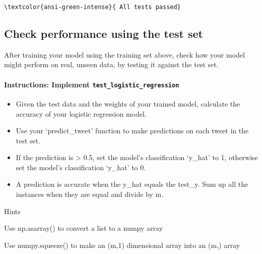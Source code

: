 \documentclass[11pt]{article}
\providecommand{\tightlist}{%
      \setlength{\itemsep}{0pt}\setlength{\parskip}{0pt}}
\begin{document}
    \begin{Verbatim}[commandchars=\\\{\}]
\textcolor{ansi-green-intense}{ All tests passed}
    \end{Verbatim}

    \hypertarget{check-performance-using-the-test-set}{%
\subsection{Check performance using the test
set}\label{check-performance-using-the-test-set}}

After training your model using the training set above, check how your
model might perform on real, unseen data, by testing it against the test
set.

\hypertarget{instructions-implement-test_logistic_regression}{%
\paragraph{\texorpdfstring{Instructions: Implement
\texttt{test\_logistic\_regression}}{Instructions: Implement test\_logistic\_regression}}\label{instructions-implement-test_logistic_regression}}

\begin{itemize}
\tightlist
\item
  Given the test data and the weights of your trained model, calculate
  the accuracy of your logistic regression model.
\item
  Use your `predict\_tweet' function to make predictions on each tweet
  in the test set.
\item
  If the prediction is \textgreater{} 0.5, set the model's
  classification `y\_hat' to 1, otherwise set the model's classification
  `y\_hat' to 0.
\item
  A prediction is accurate when the y\_hat equals the test\_y. Sum up
  all the instances when they are equal and divide by m.
\end{itemize}

    Hints

Use np.asarray() to convert a list to a numpy array

Use numpy.squeeze() to make an (m,1) dimensional array into an (m,)
array
\end{document}
